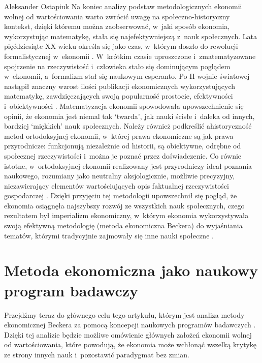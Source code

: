 \begin{artplenv}{Aleksander Ostapiuk}
Na koniec analizy podstaw metodologicznych ekonomii wolnej od wartościowania warto zwrócić uwagę na
społeczno-historyczny kontekst, dzięki któremu można zaobserwować, w~jaki sposób ekonomia, wykorzystując matematykę,
stała się najefektywniejszą z~nauk społecznych. Lata pięćdziesiąte XX wieku określa się jako czas, w~którym doszło do rewolucji
formalistycznej w~ekonomii
\parencite{blaug_formalist_2003}.
W~krótkim czasie uproszczone i~zmatematyzowane
spojrzenie na rzeczywistość i~człowieka stało się dominującym poglądem w~ekonomii, a~formalizm stał się naukowym
esperanto. Po II wojnie światowej nastąpił znaczny wzrost ilości publikacji ekonomicznych wykorzystujących matematykę,
zawdzięczających swoją popularność prostocie, efektywności i~obiektywności
\parencite{debreu_mathematization_1991}.
Matematyzacja ekonomii spowodowała upowszechnienie się opinii, że ekonomia jest niemal tak `twarda', jak nauki
ścisłe i~daleka od innych, bardziej `miękkich' nauk społecznych.
Należy również podkreślić ahistoryczność metod ortodoksyjnej
ekonomii, w~której prawa ekonomiczne są jak prawa przyrodnicze: funkcjonują niezależnie od historii, są obiektywne,
odrębne od społecznej rzeczywistości i~można je poznać przez doświadczenie. Co równie istotne, w~ortodoksyjnej ekonomii
realizowany jest przyrodniczy ideał poznania naukowego, rozumiany jako neutralny aksjologicznie, możliwie precyzyjny,
niezawierający elementów wartościujących opis faktualnej rzeczywistości gospodarczej
\parencite[zob.][]{zboron_dyskurs_2013}.
Dzięki przyjęciu tej metodologii upowszechnił się pogląd, że ekonomia osiągnęła najszybszy rozwój ze
wszystkich nauk społecznych, czego rezultatem był imperializm ekonomiczny, w~którym ekonomia wykorzystywała swoją
efektywną metodologię (metoda ekonomiczna Beckera) do wyjaśniania tematów, którymi tradycyjnie zajmowały się inne nauki
społeczne
\parencite{lazear_economic_2000,maki_economics_2009,maki_scientific_2017}.

\section{Metoda ekonomiczna jako naukowy program badawczy}
Przejdźmy teraz do głównego celu tego artykułu, którym jest analiza metody ekonomicznej Beckera za pomocą koncepcji
naukowych programów badawczych
\parencite{lakatos_methodology_1980}.
Dzięki tej analizie będzie możliwe omówienie
głównych założeń ekonomii wolnej od wartościowania, które powodują, że ekonomia może wchłonąć wszelką krytykę ze strony
innych nauk i~pozostawić paradygmat bez zmian. 


\end{artplenv}

